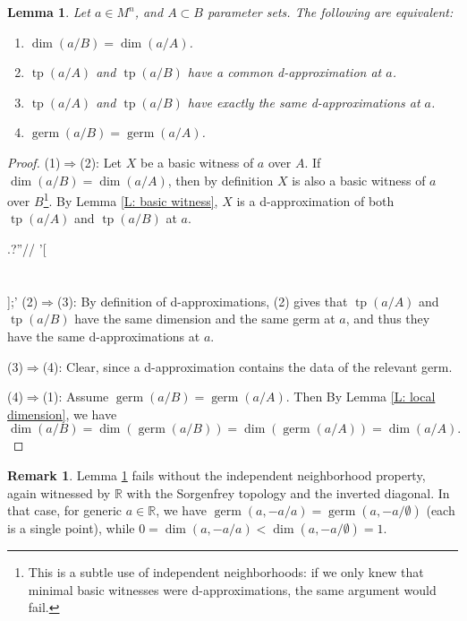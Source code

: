 \documentclass{amsart}
\newtheorem{lemma}[theorem]{Lemma}
\theoremstyle{definition}
\newtheorem{remark}[theorem]{Remark}
\newcommand{\tp}{\operatorname{tp}}
\begin{document}
\begin{lemma}\label{L: weakly ind}
    Let $a\in M^n$, and $A\subset B$ parameter sets. The following are equivalent:
    \begin{enumerate}
        \item $\dim(a/B)=\dim(a/A)$.
        \item $\tp(a/A)$ and $\tp(a/B)$ have a common d-approximation at $a$.
        \item $\tp(a/A)$ and $\tp(a/B)$ have exactly the same d-approximations at $a$.
        \item $\operatorname{germ}(a/B)=\operatorname{germ}(a/A)$.
    \end{enumerate}
\end{lemma}
\begin{proof}
    (1)$\Rightarrow$(2): Let $X$ be a basic witness of $a$ over $A$. If $\dim(a/B)=\dim(a/A)$, then by definition $X$ is also a basic witness of $a$ over $B$\footnote{This is a subtle use of independent neighborhoods: if we only knew that minimal basic witnesses were d-approximations, the same argument would fail.}. By Lemma \ref{L: basic witness}, $X$ is a d-approximation of both $\tp(a/A)$ and $\tp(a/B)$ at $a$.

.?''//
'[
\\\\\\
];'    (2)$\Rightarrow$(3): By definition of d-approximations, (2) gives that $\tp(a/A)$ and $\tp(a/B)$ have the same dimension and the same germ at $a$, and thus they have the same d-approximations at $a$.

    (3)$\Rightarrow$(4): Clear, since a d-approximation contains the data of the relevant germ.

    (4)$\Rightarrow$(1): Assume $\operatorname{germ}(a/B)=\operatorname{germ}(a/A)$. Then By Lemma \ref{L: local dimension}, we have $$\dim(a/B)=\dim(\operatorname{germ}(a/B))=\dim(\operatorname{germ}(a/A))=\dim(a/A).$$
\end{proof}

\begin{remark}
    Lemma \ref{L: weakly ind} fails without the independent neighborhood property, again witnessed by $\mathbb R$ with the Sorgenfrey topology and the inverted diagonal. In that case, for generic $a\in\mathbb R$, we have $\operatorname{germ}(a,-a/a)=\operatorname{germ}(a,-a/\emptyset)$ (each is a single point), while $0=\dim(a,-a/a)<\dim(a,-a/\emptyset)=1$.
\end{remark}
\end{document}

